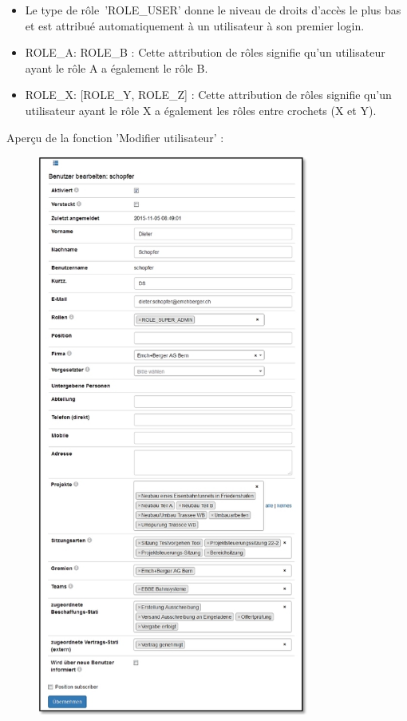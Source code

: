 \begin{itemize}
\item
Le type de rôle~'ROLE\_USER' donne le niveau de droits d'accès le plus bas et est attribué automatiquement à un utilisateur à son premier login.
\item
ROLE\_A: ROLE\_B : Cette attribution de rôles signifie qu'un utilisateur ayant le rôle A a également le rôle B.
\item
ROLE\_X: [ROLE\_Y, ROLE\_Z] : Cette attribution de rôles signifie qu'un utilisateur ayant le rôle X a également les rôles entre crochets (X et Y).
\end{itemize}

Aperçu de la fonction 'Modifier utilisateur' :

\vspace{\baselineskip}
\vspace{\baselineskip}

\begin{figure}
\vspace{-55pt}
\includegraphics[height=185mm]{../chapters/14_Benutzerverwaltung/pictures/14-1-1_BenutzerBearbeiten.jpg}
\end{figure}

